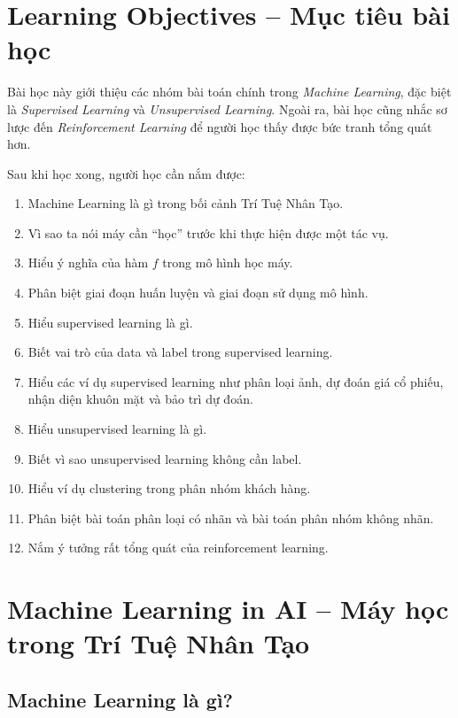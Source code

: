 \section*{Learning Objectives -- Mục tiêu bài học}

Bài học này giới thiệu các nhóm bài toán chính trong \textit{Machine Learning}, đặc biệt là \textit{Supervised Learning} và \textit{Unsupervised Learning}. Ngoài ra, bài học cũng nhắc sơ lược đến \textit{Reinforcement Learning} để người học thấy được bức tranh tổng quát hơn.

Sau khi học xong, người học cần nắm được:

\begin{enumerate}[label=\arabic*.]
    \item Machine Learning là gì trong bối cảnh Trí Tuệ Nhân Tạo.
    \item Vì sao ta nói máy cần ``học'' trước khi thực hiện được một tác vụ.
    \item Hiểu ý nghĩa của hàm $f$ trong mô hình học máy.
    \item Phân biệt giai đoạn huấn luyện và giai đoạn sử dụng mô hình.
    \item Hiểu supervised learning là gì.
    \item Biết vai trò của data và label trong supervised learning.
    \item Hiểu các ví dụ supervised learning như phân loại ảnh, dự đoán giá cổ phiếu, nhận diện khuôn mặt và bảo trì dự đoán.
    \item Hiểu unsupervised learning là gì.
    \item Biết vì sao unsupervised learning không cần label.
    \item Hiểu ví dụ clustering trong phân nhóm khách hàng.
    \item Phân biệt bài toán phân loại có nhãn và bài toán phân nhóm không nhãn.
    \item Nắm ý tưởng rất tổng quát của reinforcement learning.
\end{enumerate}

\section{Machine Learning in AI -- Máy học trong Trí Tuệ Nhân Tạo}

\subsection{Machine Learning là gì?}

